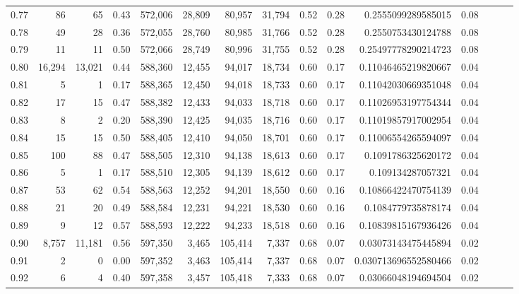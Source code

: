 \begin{tabular}{rrrrrrrrrrrrrrr}
0.77 &      86 &      65 &  0.43 &  572,006 &   28,809 &   80,957 &   31,794 &  0.52 &  0.28 &    0.2555099289585015 &      0.08 \\
0.78 &      49 &      28 &  0.36 &  572,055 &   28,760 &   80,985 &   31,766 &  0.52 &  0.28 &    0.2550753430124788 &      0.08 \\
0.79 &      11 &      11 &  0.50 &  572,066 &   28,749 &   80,996 &   31,755 &  0.52 &  0.28 &   0.25497778290214723 &      0.08 \\
0.80 &  16,294 &  13,021 &  0.44 &  588,360 &   12,455 &   94,017 &   18,734 &  0.60 &  0.17 &   0.11046465219820667 &      0.04 \\
0.81 &       5 &       1 &  0.17 &  588,365 &   12,450 &   94,018 &   18,733 &  0.60 &  0.17 &   0.11042030669351048 &      0.04 \\
0.82 &      17 &      15 &  0.47 &  588,382 &   12,433 &   94,033 &   18,718 &  0.60 &  0.17 &   0.11026953197754344 &      0.04 \\
0.83 &       8 &       2 &  0.20 &  588,390 &   12,425 &   94,035 &   18,716 &  0.60 &  0.17 &   0.11019857917002954 &      0.04 \\
0.84 &      15 &      15 &  0.50 &  588,405 &   12,410 &   94,050 &   18,701 &  0.60 &  0.17 &   0.11006554265594097 &      0.04 \\
0.85 &     100 &      88 &  0.47 &  588,505 &   12,310 &   94,138 &   18,613 &  0.60 &  0.17 &    0.1091786325620172 &      0.04 \\
0.86 &       5 &       1 &  0.17 &  588,510 &   12,305 &   94,139 &   18,612 &  0.60 &  0.17 &     0.109134287057321 &      0.04 \\
0.87 &      53 &      62 &  0.54 &  588,563 &   12,252 &   94,201 &   18,550 &  0.60 &  0.16 &   0.10866422470754139 &      0.04 \\
0.88 &      21 &      20 &  0.49 &  588,584 &   12,231 &   94,221 &   18,530 &  0.60 &  0.16 &    0.1084779735878174 &      0.04 \\
0.89 &       9 &      12 &  0.57 &  588,593 &   12,222 &   94,233 &   18,518 &  0.60 &  0.16 &   0.10839815167936426 &      0.04 \\
0.90 &   8,757 &  11,181 &  0.56 &  597,350 &    3,465 &  105,414 &    7,337 &  0.68 &  0.07 &   0.03073143475445894 &      0.02 \\
0.91 &       2 &       0 &  0.00 &  597,352 &    3,463 &  105,414 &    7,337 &  0.68 &  0.07 &  0.030713696552580466 &      0.02 \\
0.92 &       6 &       4 &  0.40 &  597,358 &    3,457 &  105,418 &    7,333 &  0.68 &  0.07 &   0.03066048194694504 &      0.02 \\

\end{tabular}
